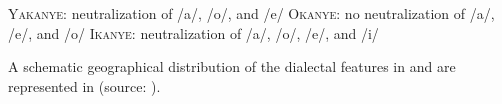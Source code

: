 \documentclass[output=paper,
modfonts,
newtxmath,
hidelinks,
]{langscibook}
\begin{document}
\label{5:12}
\ea \textsc{Yakanye:} neutralization of /a/, /o/, and /e/
\ex \textsc{Okanye:} no neutralization of /a/, /e/, and /o/
\ex \textsc{Ikanye:} neutralization of /a/, /o/, /e/, and /i/
\z\z

\noindent A schematic geographical distribution of the dialectal features in  and  are represented in  (source: \citealt{Bukrinskaja-etal1994}).

\begin{figure}
\end{figure}
\end{document}
